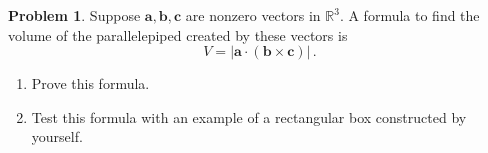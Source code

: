 \documentclass[12pt]{article}
\newcommand{\vect}{\mathbf}
\theoremstyle{definition}
\newtheorem{problem}{Problem}
\newcommand{\R}{\mathbb{R}}
\begin{document}
\begin{problem}
    Suppose $\vect{a}, \vect{b}, \vect{c}$ are
    nonzero vectors in $\R^3$.
    A formula to find the volume of the parallelepiped
    created by these vectors is
    \begin{equation*}
        V = | \vect{a} \cdot (\vect{b}\times \vect{c})| \,.
    \end{equation*}
    \begin{enumerate}
        \item Prove this formula.
        \item Test this formula with an example of a rectangular box constructed by yourself.
    \end{enumerate}
\end{problem}

%
\end{document}
